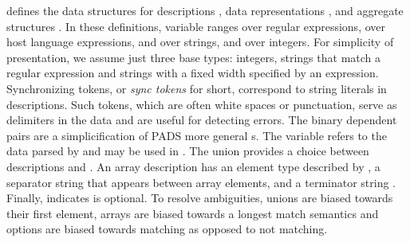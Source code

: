 
 defines
the data structures for descriptions , data
representations , and aggregate structures .
In these definitions,  variable  ranges over regular expressions,
 over host language expressions,
 and  over strings, and  over integers.
For simplicity of presentation, we assume just three base types: 
integers, strings that match a regular expression and strings with a
fixed width specified by an expression. Synchronizing
tokens, or {\em sync tokens} for short, correspond to string literals
in \pads{} descriptions.  Such tokens, which are often
white spaces or punctuation,
serve as delimiters in the data and are useful for detecting
errors. The binary dependent pairs  are
a simplicification of PADS more general s. 
The variable  refers to the data parsed by 
and may be used in . The union 
provides a choice between descriptions  and .
An array description
 has an element type described by , a separator
string  that appears between array elements, and a
terminator string . Finally,  indicates  is 
optional.  To resolve ambiguities, unions are
biased towards their first element, arrays are biased towards a longest match
semantics and options are biased towards matching as opposed to not matching.

